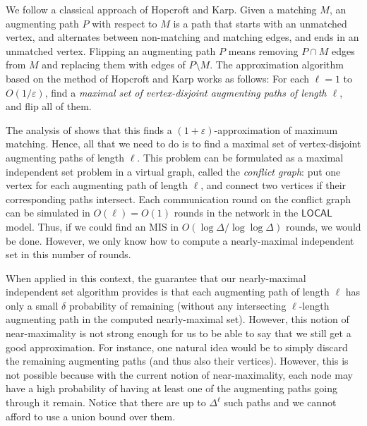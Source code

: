 \documentclass[11pt]{article}
\newcommand{\eps}{\varepsilon}
\begin{document}
We follow a classical approach of Hopcroft and Karp\cite{HopcroftKarp1973}. Given a matching $M$, an augmenting path $P$ with respect to $M$ is a path that starts with an unmatched vertex, and alternates between non-matching and matching edges, and ends in an unmatched vertex. Flipping an augmenting path $P$ means removing $P \cap M$ edges from $M$ and replacing them with edges of $P\setminus M$. The approximation algorithm based on the method of Hopcroft and Karp\cite{HopcroftKarp1973} works as follows: For each $\ell =1$ to $O(1/\eps)$, find a \emph{maximal set of vertex-disjoint augmenting paths of length $\ell$}, and flip all of them.


\noindent The analysis of \cite{HopcroftKarp1973}  shows that this finds a $(1+\eps)$-approximation of maximum matching. Hence, all that we need to do is to find a maximal set of vertex-disjoint augmenting paths of length $\ell$. This problem can be formulated as a maximal independent set problem in a virtual graph, called the \emph{conflict graph}: put one vertex for each augmenting path of length $\ell$, and connect two vertices if their corresponding paths intersect. Each communication round on the conflict graph can be simulated in $O(\ell) = O(1)$ rounds in the network in the $\mathsf{LOCAL}$ model. Thus, if we could find an MIS in $O(\log \Delta/\log\log \Delta)$ rounds, we would be done. However, we only know how to compute a nearly-maximal independent set in this number of rounds.

When applied in this context, the guarantee that our nearly-maximal independent set algorithm provides is that each augmenting path of length $\ell$ has only a small $\delta$ probability of remaining (without any intersecting $\ell$-length augmenting path in the computed nearly-maximal set). However, this notion of near-maximality is not strong enough for us to be able to say that we still get a good approximation. For instance, one natural idea would be to simply discard the remaining augmenting paths (and thus also their vertices). However, this is not possible because with the current notion of near-maximality, each node may have a high probability of having at least one of the augmenting paths going through it remain. Notice that there are up to $\Delta^\ell$ such paths and we cannot afford to use a union bound over them.
\end{document}
